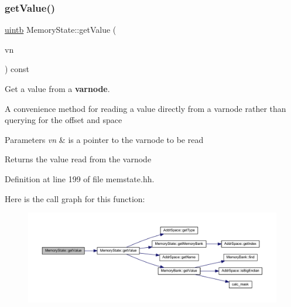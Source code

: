 \subsubsection{\texorpdfstring{getValue()}{getValue()}\hspace{0.1cm}{\footnotesize\ttfamily [3/3]}}
{\footnotesize\ttfamily \mbox{\hyperlink{types_8h_a2db313c5d32a12b01d26ac9b3bca178f}{uintb}} Memory\+State\+::get\+Value (\begin{DoxyParamCaption}\item[{const \mbox{\hyperlink{struct_varnode_data}{Varnode\+Data}} $\ast$}]{vn }\end{DoxyParamCaption}) const\hspace{0.3cm}{\ttfamily [inline]}}



Get a value from a {\bfseries{varnode}}. 

A convenience method for reading a value directly from a varnode rather than querying for the offset and space 
\begin{DoxyParams}{Parameters}
{\em vn} & is a pointer to the varnode to be read \\
\hline
\end{DoxyParams}
\begin{DoxyReturn}{Returns}
the value read from the varnode 
\end{DoxyReturn}


Definition at line 199 of file memstate.\+hh.

Here is the call graph for this function\+:
\nopagebreak
\begin{figure}[H]
\begin{center}
\leavevmode
\includegraphics[width=350pt]{class_memory_state_a9b0f55b9ff7e228fd09e0b550e8479f2_cgraph}
\end{center}
\end{figure}
\mbox{\label{class_memory_state_aa8d03c2a848a00090098b75f1fe877e1}} 
